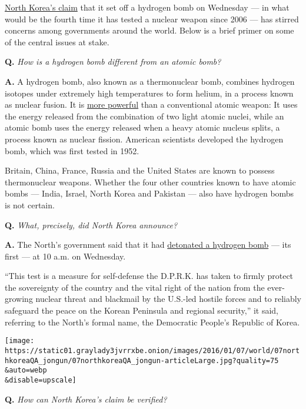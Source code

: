 \href{http://www.nytimes3xbfgragh.onion/2016/01/07/world/asia/north-korea-hydrogen-bomb-claim-reactions.html}{North
Korea's claim} that it set off a hydrogen bomb on Wednesday --- in what
would be the fourth time it has tested a nuclear weapon since 2006 ---
has stirred concerns among governments around the world. Below is a
brief primer on some of the central issues at stake.

\textbf{Q.} \emph{How is a hydrogen bomb different from an atomic bomb?}

\textbf{A.} A hydrogen bomb, also known as a thermonuclear bomb,
combines hydrogen isotopes under extremely high temperatures to form
helium, in a process known as nuclear fusion. It is
\href{http://www.ucsusa.org/nuclear-weapons/us-nuclear-weapons-policy/how-nuclear-weapons-work\#.Vo0mr5OLRQN}{more
powerful} than a conventional atomic weapon: It uses the energy released
from the combination of two light atomic nuclei, while an atomic bomb
uses the energy released when a heavy atomic nucleus splits, a process
known as nuclear fission. American scientists developed the hydrogen
bomb, which was first tested in 1952.

Britain, China, France, Russia and the United States are known to
possess thermonuclear weapons. Whether the four other countries known to
have atomic bombs --- India, Israel, North Korea and Pakistan --- also
have hydrogen bombs is not certain.

\textbf{Q.} \emph{What, precisely, did North Korea announce?}

\textbf{A.} The North's government said that it had
\href{http://www.nytimes3xbfgragh.onion/2016/01/06/world/asia/north-korea-hydrogen-bomb-test.html}{detonated
a hydrogen bomb} --- its first --- at 10 a.m. on Wednesday.

``This test is a measure for self-defense the D.P.R.K. has taken to
firmly protect the sovereignty of the country and the vital right of the
nation from the ever-growing nuclear threat and blackmail by the
U.S.-led hostile forces and to reliably safeguard the peace on the
Korean Peninsula and regional security,'' it said, referring to the
North's formal name, the Democratic People's Republic of Korea.

\texttt{[image: https://static01.graylady3jvrrxbe.onion/images/2016/01/07/world/07northkoreaQA\_jongun/07northkoreaQA\_jongun-articleLarge.jpg?quality=75\\\&auto=webp\\\&disable=upscale]}

\textbf{Q.} \emph{How can North Korea's claim be verified?}

